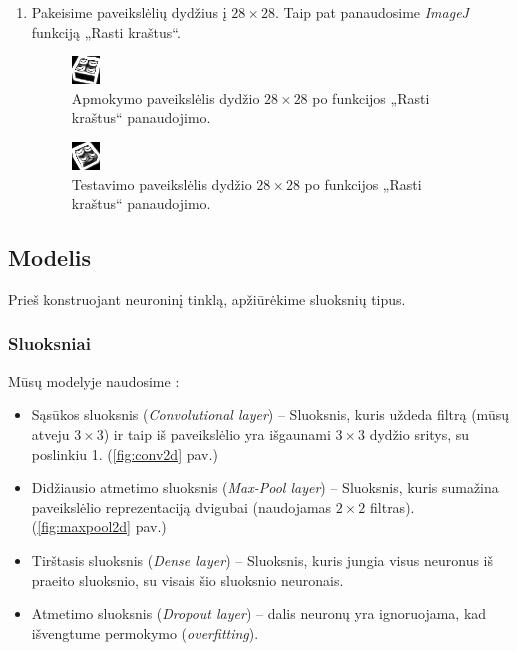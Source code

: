 \documentclass{VUMIFInfKursinis}
\begin{document}
\begin{enumerate}
    \newpage
    \item Pakeisime paveikslėlių dydžius į $28\times28$. Taip pat panaudosime \textit{ImageJ} funkciją „Rasti kraštus“.
    
    \begin{figure}[h!]
    \centering
      \includegraphics[scale=2.0]{img/train7}
      \caption{Apmokymo paveikslėlis dydžio $28\times28$ po funkcijos „Rasti kraštus“ panaudojimo.}
      \label{fig:train7}
    \end{figure}
    
    \begin{figure}[h!]
    \centering
      \includegraphics[scale=2.0]{img/test7}
      \caption{Testavimo paveikslėlis dydžio $28\times28$ po funkcijos „Rasti kraštus“ panaudojimo.}
      \label{fig:test7}
    \end{figure}
    
    

\end{enumerate}

\newpage

\subsection{Modelis}

Prieš konstruojant neuroninį tinklą, apžiūrėkime sluoksnių tipus.

\subsubsection{Sluoksniai}

Mūsų modelyje naudosime \cite{3}:

\begin{itemize}
  \item Sąsūkos sluoksnis (\textit{Convolutional layer}) -- Sluoksnis, kuris uždeda filtrą (mūsų atveju $3\times3$) ir taip iš paveikslėlio yra išgaunami $3\times3$ dydžio sritys, su poslinkiu 1. (\ref{fig:conv2d} pav.) 
  \item Didžiausio atmetimo sluoksnis (\textit{Max-Pool layer}) -- Sluoksnis, kuris sumažina paveikslėlio reprezentaciją dvigubai (naudojamas $2\times2$ filtras). (\ref{fig:maxpool2d} pav.) 
  \item Tirštasis sluoksnis (\textit{Dense layer}) -- Sluoksnis, kuris jungia visus neuronus iš praeito sluoksnio, su visais šio sluoksnio neuronais.
  \item Atmetimo sluoksnis (\textit{Dropout layer}) -- dalis neuronų yra ignoruojama, kad išvengtume permokymo (\textit{overfitting}).
\end{itemize} 
\end{document}
